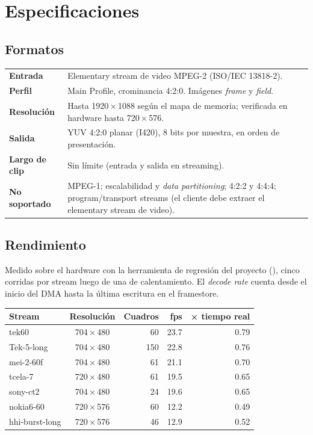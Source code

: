 \chapter{Especificaciones}

\section{Formatos}

\begin{center}
\begin{tabularx}{\linewidth}{@{}l X@{}}
\toprule
\textbf{Entrada} & Elementary stream de video MPEG-2 (ISO/IEC 13818-2). \\
\textbf{Perfil} & Main Profile, crominancia 4:2:0. Imágenes \emph{frame} y
  \emph{field}. \\
\textbf{Resolución} & Hasta 1920\,×\,1088 según el mapa de memoria; verificada
  en hardware hasta 720\,×\,576. \\
\textbf{Salida} & YUV 4:2:0 planar (I420), 8 bits por muestra, en orden de
  presentación. \\
\textbf{Largo de clip} & Sin límite (entrada y salida en streaming). \\
\midrule
\textbf{No soportado} & MPEG-1; escalabilidad y \emph{data partitioning};
  4:2:2 y 4:4:4; program/transport streams (el cliente debe extraer el
  elementary stream de video). \\
\bottomrule
\end{tabularx}
\end{center}

\section{Rendimiento}

Medido sobre el hardware con la herramienta de regresión del proyecto
(), cinco corridas por stream luego de una de
calentamiento. El \emph{decode rate} cuenta desde el inicio del DMA hasta la
última escritura en el framestore.

\begin{center}
\begin{tabular}{@{}l c r r r@{}}
\toprule
\textbf{Stream} & \textbf{Resolución} & \textbf{Cuadros} & \textbf{fps} & \textbf{× tiempo real} \\
\midrule
tek60          & 704\,×\,480 &  60 & 23.7 & 0.79 \\
Tek-5-long     & 704\,×\,480 & 150 & 22.8 & 0.76 \\
mei-2-60f      & 704\,×\,480 &  61 & 21.1 & 0.70 \\
tcela-7        & 720\,×\,480 &  61 & 19.5 & 0.65 \\
sony-ct2       & 704\,×\,480 &  24 & 19.6 & 0.65 \\
nokia6-60      & 720\,×\,576 &  60 & 12.2 & 0.49 \\
hhi-burst-long & 720\,×\,576 &  46 & 12.9 & 0.52 \\
\bottomrule
\end{tabular}
\end{center}


